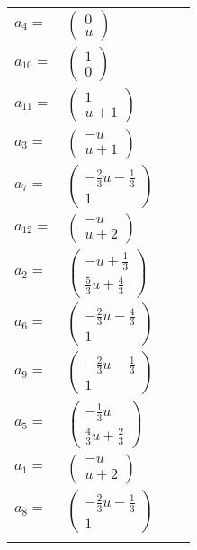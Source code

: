\documentclass[1p]{elsarticle_modified}
\theoremstyle{definition}
\begin{document}
\begin{tabular}{m{7pt} m{180pt} m{7pt} m{180pt} }
\flushright $a_{4}=$&$\begin{pmatrix}0\\u\end{pmatrix}$ \\
\flushright $a_{10}=$&$\begin{pmatrix}1\\0\end{pmatrix}$ \\
\flushright $a_{11}=$&$\begin{pmatrix}1\\u+1\end{pmatrix}$ \\
\flushright $a_{3}=$&$\begin{pmatrix}- u\\u+1\end{pmatrix}$ \\
\flushright $a_{7}=$&$\begin{pmatrix}-\frac{2}{3} u-\frac{1}{3}\\1\end{pmatrix}$ \\
\flushright $a_{12}=$&$\begin{pmatrix}- u\\u+2\end{pmatrix}$ \\
\flushright $a_{2}=$&$\begin{pmatrix}- u+\frac{1}{3}\\\frac{5}{3} u+\frac{4}{3}\end{pmatrix}$ \\
\flushright $a_{6}=$&$\begin{pmatrix}-\frac{2}{3} u-\frac{4}{3}\\1\end{pmatrix}$ \\
\flushright $a_{9}=$&$\begin{pmatrix}-\frac{2}{3} u-\frac{1}{3}\\1\end{pmatrix}$ \\
\flushright $a_{5}=$&$\begin{pmatrix}-\frac{1}{3} u\\\frac{4}{3} u+\frac{2}{3}\end{pmatrix}$ \\
\flushright $a_{1}=$&$\begin{pmatrix}- u\\u+2\end{pmatrix}$ \\
\flushright $a_{8}=$&$\begin{pmatrix}-\frac{2}{3} u-\frac{1}{3}\\1\end{pmatrix}$\\&\end{tabular}
\end{document}
